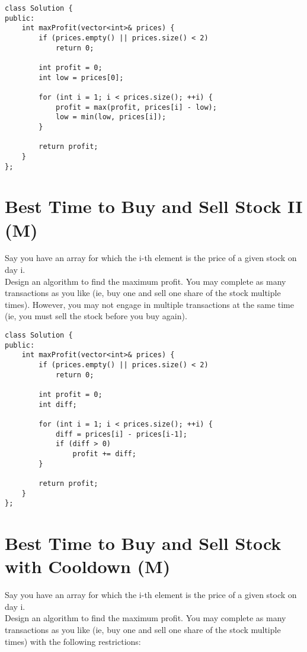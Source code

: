 \begin{lstlisting}
class Solution {
public:
    int maxProfit(vector<int>& prices) {
        if (prices.empty() || prices.size() < 2)
            return 0;
        
        int profit = 0;
        int low = prices[0];
        
        for (int i = 1; i < prices.size(); ++i) {
            profit = max(profit, prices[i] - low);
            low = min(low, prices[i]);
        }
        
        return profit;
    }
};
\end{lstlisting}


\section{Best Time to Buy and Sell Stock II (M)}
Say you have an array for which the i-th element is the price of a given stock on day i. \\

Design an algorithm to find the maximum profit. You may complete as many transactions as you like (ie, buy one and sell one share of the stock multiple times). However, you may not engage in multiple transactions at the same time (ie, you must sell the stock before you buy again). \\

\begin{lstlisting}
class Solution {
public:
    int maxProfit(vector<int>& prices) {
        if (prices.empty() || prices.size() < 2)
            return 0;
        
        int profit = 0;
        int diff;
        
        for (int i = 1; i < prices.size(); ++i) {
            diff = prices[i] - prices[i-1];
            if (diff > 0)
                profit += diff;
        }
        
        return profit;
    }
};
\end{lstlisting}


\section{Best Time to Buy and Sell Stock with Cooldown (M)}
Say you have an array for which the i-th element is the price of a given stock on day i.\\

Design an algorithm to find the maximum profit. You may complete as many transactions as you like (ie, buy one and sell one share of the stock multiple times) with the following restrictions:\\

